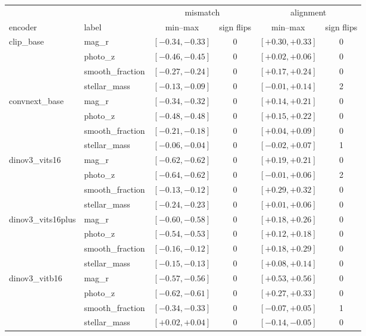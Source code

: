 \begin{tabular}{llcccc}
\toprule
 & & \multicolumn{2}{c}{mismatch} & \multicolumn{2}{c}{alignment} \\
encoder & label & min--max & sign flips & min--max & sign flips \\
\midrule
clip\_base & mag\_r & $[-0.34, -0.33]$ & 0 & $[+0.30, +0.33]$ & 0 \\
 & photo\_z & $[-0.46, -0.45]$ & 0 & $[+0.02, +0.06]$ & 0 \\
 & smooth\_fraction & $[-0.27, -0.24]$ & 0 & $[+0.17, +0.24]$ & 0 \\
 & stellar\_mass & $[-0.13, -0.09]$ & 0 & $[-0.01, +0.14]$ & 2 \\
\addlinespace[2pt]
convnext\_base & mag\_r & $[-0.34, -0.32]$ & 0 & $[+0.14, +0.21]$ & 0 \\
 & photo\_z & $[-0.48, -0.48]$ & 0 & $[+0.15, +0.22]$ & 0 \\
 & smooth\_fraction & $[-0.21, -0.18]$ & 0 & $[+0.04, +0.09]$ & 0 \\
 & stellar\_mass & $[-0.06, -0.04]$ & 0 & $[-0.02, +0.07]$ & 1 \\
\addlinespace[2pt]
dinov3\_vits16 & mag\_r & $[-0.62, -0.62]$ & 0 & $[+0.19, +0.21]$ & 0 \\
 & photo\_z & $[-0.64, -0.62]$ & 0 & $[-0.01, +0.06]$ & 2 \\
 & smooth\_fraction & $[-0.13, -0.12]$ & 0 & $[+0.29, +0.32]$ & 0 \\
 & stellar\_mass & $[-0.24, -0.23]$ & 0 & $[+0.01, +0.06]$ & 0 \\
\addlinespace[2pt]
dinov3\_vits16plus & mag\_r & $[-0.60, -0.58]$ & 0 & $[+0.18, +0.26]$ & 0 \\
 & photo\_z & $[-0.54, -0.53]$ & 0 & $[+0.12, +0.18]$ & 0 \\
 & smooth\_fraction & $[-0.16, -0.12]$ & 0 & $[+0.18, +0.29]$ & 0 \\
 & stellar\_mass & $[-0.15, -0.13]$ & 0 & $[+0.08, +0.14]$ & 0 \\
\addlinespace[2pt]
dinov3\_vitb16 & mag\_r & $[-0.57, -0.56]$ & 0 & $[+0.53, +0.56]$ & 0 \\
 & photo\_z & $[-0.62, -0.61]$ & 0 & $[+0.27, +0.33]$ & 0 \\
 & smooth\_fraction & $[-0.34, -0.33]$ & 0 & $[-0.07, +0.05]$ & 1 \\
 & stellar\_mass & $[+0.02, +0.04]$ & 0 & $[-0.14, -0.05]$ & 0 \\

\end{tabular}
